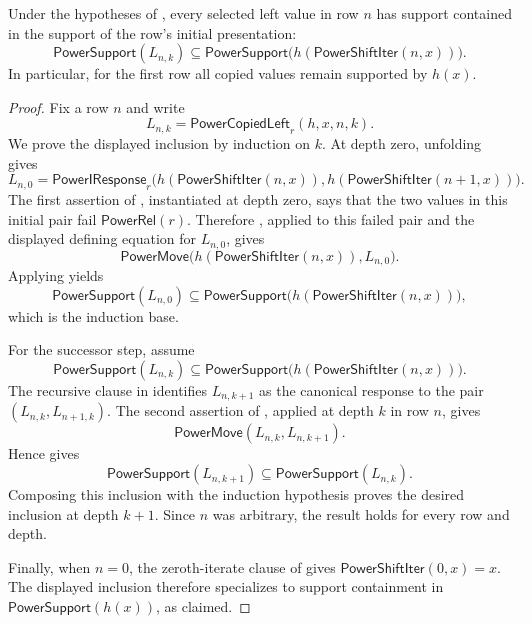 \begin{lemma}
Under the hypotheses of , every selected
left value in row $n$ has support contained in the support of the row's
initial presentation:
\[
\mathsf{PowerSupport}(L_{n,k})
\subseteq
\mathsf{PowerSupport}\bigl(h(\mathsf{PowerShiftIter}(n,x))\bigr).
\]
In particular, for the first row all copied values remain supported by
$h(x)$.
\end{lemma}
\begin{proof}
Fix a row $n$ and write
\[
L_{n,k}=\mathsf{PowerCopiedLeft}_r(h,x,n,k).
\]
We prove the displayed inclusion by induction on $k$.  At depth zero,
unfolding  gives
\[
L_{n,0}=\mathsf{PowerIResponse}_r\bigl(
  h(\mathsf{PowerShiftIter}(n,x)),
  h(\mathsf{PowerShiftIter}(n+1,x))\bigr).
\]
The first assertion of , instantiated at
depth zero, says that the two values in this initial pair fail
$\mathsf{PowerRel}(r)$.  Therefore , applied
to this failed pair and the displayed defining equation for $L_{n,0}$,
gives
\[
\mathsf{PowerMove}\bigl(h(\mathsf{PowerShiftIter}(n,x)),L_{n,0}\bigr).
\]
Applying  yields
\[
\mathsf{PowerSupport}(L_{n,0})
\subseteq
\mathsf{PowerSupport}\bigl(h(\mathsf{PowerShiftIter}(n,x))\bigr),
\]
which is the induction base.

For the successor step, assume
\[
\mathsf{PowerSupport}(L_{n,k})
\subseteq
\mathsf{PowerSupport}\bigl(h(\mathsf{PowerShiftIter}(n,x))\bigr).
\]
The recursive clause in  identifies
$L_{n,k+1}$ as the canonical response to the pair
$(L_{n,k},L_{n+1,k})$.  The second assertion of
, applied at depth $k$ in row $n$, gives
\[
\mathsf{PowerMove}(L_{n,k},L_{n,k+1}).
\]
Hence  gives
\[
\mathsf{PowerSupport}(L_{n,k+1})
\subseteq \mathsf{PowerSupport}(L_{n,k}).
\]
Composing this inclusion with the induction hypothesis proves the desired
inclusion at depth $k+1$.  Since $n$ was arbitrary, the result holds for
every row and depth.

Finally, when $n=0$, the zeroth-iterate clause of
 gives $\mathsf{PowerShiftIter}(0,x)=x$.
The displayed inclusion therefore specializes to support containment in
$\mathsf{PowerSupport}(h(x))$, as claimed.
\end{proof}
